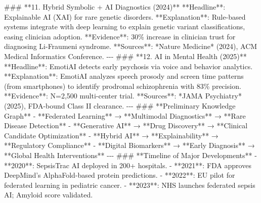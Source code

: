 \documentclass{article}%
\begin{document}
%
\#\#\# **11. Hybrid Symbolic + AI Diagnostics (2024)**\newline%
%
**Headline**: Explainable AI (XAI) for rare genetic disorders.\newline%
%
**Explanation**: Rule{-}based systems integrate with deep learning to explain genetic variant classifications, easing clinician adoption.\newline%
%
**Evidence**: 30\% increase in clinician trust for diagnosing Li{-}Fraumeni syndrome.\newline%
%
**Sources**: *Nature Medicine* (2024), ACM Medical Informatics Conference.\newline%
%
{-}{-}{-}\newline%
%
\#\#\# **12. AI in Mental Health (2025)**\newline%
%
**Headline**: EmotiAI detects early psychosis via voice and behavior analytics.\newline%
%
**Explanation**: EmotiAI analyzes speech prosody and screen time patterns (from smartphones) to identify prodromal schizophrenia with 83\% precision.\newline%
%
**Evidence**: N=2,500 multi{-}center trial.\newline%
%
**Sources**: *JAMA Psychiatry* (2025), FDA{-}bound Class II clearance.\newline%
%
{-}{-}{-}\newline%
%
\#\#\# **Preliminary Knowledge Graph**\newline%
%
{-} **Federated Learning** → **Multimodal Diagnostics** → **Rare Disease Detection**\newline%
%
{-} **Generative AI** → **Drug Discovery** → **Clinical Candidate Optimization**\newline%
%
{-} **Hybrid AI** → **Explainability** → **Regulatory Compliance**\newline%
%
{-} **Digital Biomarkers** → **Early Diagnosis** → **Global Health Interventions**\newline%
%
{-}{-}{-}\newline%
%
\#\#\# **Timeline of Major Developments**\newline%
%
{-} **2020**: SepsisTrac AI deployed in 200+ hospitals.\newline%
%
{-} **2021**: FDA approves DeepMind’s AlphaFold{-}based protein predictions.\newline%
%
{-} **2022**: EU pilot for federated learning in pediatric cancer.\newline%
%
{-} **2023**: NHS launches federated sepsis AI; Amyloid score validated.\newline%
\end{document}
